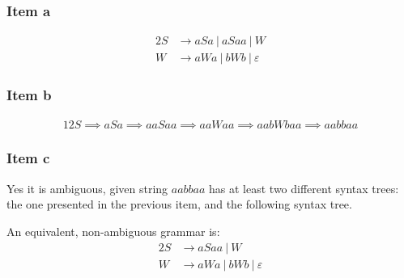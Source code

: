 {\subsubsection{Item a}
\begin{alignat*}{2}
	S &\rightarrow aSa~|~aSaa~|~W\\
	W &\rightarrow aWa~|~bWb~|~\varepsilon
\end{alignat*}
\subsubsection{Item b}
\begin{minipage}[c]{0.68\textwidth}
	\begin{alignat*}{12}
		S \implies aSa \implies aaSaa \implies aaWaa \implies aabWbaa \implies aabbaa
	\end{alignat*}
\end{minipage}
\begin{minipage}[c]{0.3\textwidth}
	\begin{center}
	\end{center}
\end{minipage}
\subsubsection{Item c}
Yes it is ambiguous, given string $aabbaa$ has at least two different syntax trees: the one presented in the previous item, and the following syntax tree.
\begin{center}
\end{center}
An equivalent, non-ambiguous grammar is:
\begin{alignat*}{2}
	S &\rightarrow aSaa~|~W\\
	W &\rightarrow aWa~|~bWb~|~\varepsilon
\end{alignat*}
}

